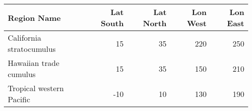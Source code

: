 \begin{tabular}{lrrrr}
  \hline
  Region Name              & Lat South & Lat North & Lon West & Lon East \\ \hline
  California stratocumulus &  15 &  35 & 220 & 250 \\
  Hawaiian trade cumulus   &  15 &  35 & 150 & 210 \\
  Tropical western Pacific & -10 &  10 & 130 & 190 \\
  \hline
\end{tabular}
